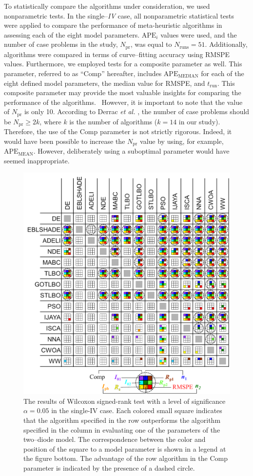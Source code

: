 \documentclass[a4paper,fleqn]{cas-sc}
\begin{document}
To statistically compare the algorithms under consideration, we used nonparametric tests. 
In the single--\emph{IV} case, all nonparametric statistical tests were applied to compare the performance 
of meta-heuristic algorithms in assessing each of the eight model parameters. 
$\mathrm{APE}_i$ values were used, and the number of case problems in the study, $N_\mathrm{pr}$, was equal to $N_\mathrm{runs}=51$. 
Additionally, algorithms were compared in terms of curve--fitting accuracy using RMSPE values. 
Furthermore, we employed tests for a composite parameter as well.
This parameter, referred to as ``Comp'' hereafter, 
includes $\mathrm{APE}_\mathrm{MEDIAN}$ for each of the eight defined model parameters, 
the median value for RMSPE, and $t_\mathrm{run}$. 
This composite parameter may provide the most valuable insights for comparing the performance of the algorithms.  
However, it is important to note that the value of $N_\mathrm{pr}$ is only 10.
According to Derrac \emph{et al.} \cite{Derrac2011}, the number of case problems should be $N_\mathrm{pr}\geq 2k$,
where $k$ is the number of algorithms ($k=14$ in our study).
Therefore, the use of the Comp parameter is not strictly rigorous. 
Indeed, it would have been possible to increase the $N_\mathrm{pr}$ value by using, 
for example, $\mathrm{APE}_\mathrm{MEAN}$. 
However, deliberately using a suboptimal parameter would have seemed inappropriate.



\begin{figure}[]
	\centering
		\includegraphics[width=0.45\columnwidth]{Fig5}
	  \caption{The results of Wilcoxon signed-rank test with a level of significance $\alpha = 0.05$ in the single-IV case.
               Each colored small square indicates that the algorithm specified in the row outperforms the algorithm
               specified in the column in evaluating one of the parameters of the two--diode model.
               The correspondence between the color and position of the square to a model parameter
               is shown in a legend at the figure bottom.
               The advantage of the row algorithm in the Comp parameter is indicated by the presence of a dashed circle.}\label{figWilSingleIV}
\end{figure}
\end{document}
